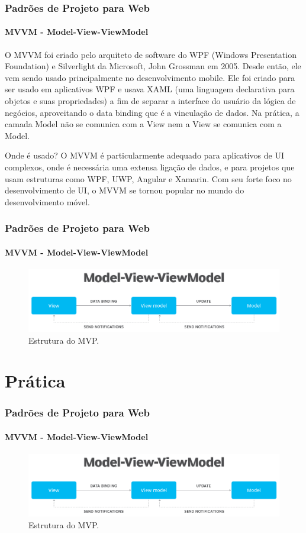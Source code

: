 \documentclass[
	10pt, %
	t, %
]{beamer}
\begin{document}
\begin{frame}
	\frametitle{Padrões de Projeto para Web}
	\framesubtitle{MVVM - Model-View-ViewModel}

	O MVVM foi criado pelo arquiteto de software do WPF  (Windows Presentation Foundation) e Silverlight da Microsoft, John Grossman em 2005. Desde então, ele vem sendo usado principalmente no desenvolvimento mobile. Ele foi criado para ser usado em aplicativos WPF e usava XAML (uma linguagem declarativa para objetos e suas propriedades) a fim de separar a interface do usuário da lógica de negócios, aproveitando o data binding que é a vinculação de dados. Na prática, a camada Model não se comunica com a View nem a View se comunica com a Model.

	\begin{block}{Onde é usado?}
		O MVVM é particularmente adequado para aplicativos de \alert{UI complexos}, onde é necessária uma extensa ligação de dados, e para projetos que usam estruturas como WPF, UWP, Angular e Xamarin. Com seu forte foco no desenvolvimento de UI, o MVVM se tornou popular no mundo do \alert{desenvolvimento móvel}.
	\end{block}

	
\end{frame}

\begin{frame}
	\frametitle{Padrões de Projeto para Web}
	\framesubtitle{MVVM - Model-View-ViewModel}

	\begin{figure}
		\centering
		\includegraphics[width=0.9\linewidth]{Images/mvvm.png}
		\caption{Estrutura do MVP.}\label{fig:mvvm}
	\end{figure}

\end{frame}

\section{Prática}

\begin{frame}
	\frametitle{Padrões de Projeto para Web}
	\framesubtitle{MVVM - Model-View-ViewModel}

	\begin{figure}
		\centering
		\includegraphics[width=0.9\linewidth]{Images/mvvm.png}
		\caption{Estrutura do MVP.}\label{fig:mvvm}
	\end{figure}

\end{frame}
\end{document}
